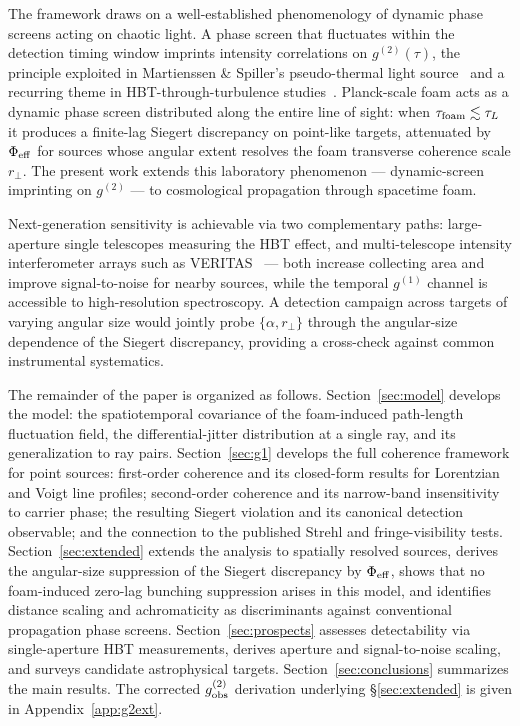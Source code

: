 \documentclass[aps,prd,onecolumn,amsmath,amssymb]{revtex4-2}
\begin{document}
The framework draws on a well-established phenomenology of dynamic phase
screens acting on chaotic light.
A phase screen that fluctuates within the detection timing window imprints
intensity correlations on $g^{(2)}(\tau)$, the principle exploited in
Martienssen \& Spiller's pseudo-thermal light source~\cite{MartienssenSpiller1964}
and a recurring theme in HBT-through-turbulence
studies~\cite{Goodman2007,MandelWolf1995}.
Planck-scale foam acts as a dynamic phase screen distributed along the
entire line of sight: when $\tau_{\rm foam}\lesssim\tau_L$ it produces a
finite-lag Siegert discrepancy on point-like targets, attenuated by
$\Phi_{\rm eff}$ for sources whose angular extent resolves the foam
transverse coherence scale $r_\perp$.
The present work extends this laboratory phenomenon --- dynamic-screen
imprinting on $g^{(2)}$ --- to cosmological propagation through spacetime foam.

Next-generation sensitivity is achievable via two complementary paths:
large-aperture single telescopes measuring the HBT effect, and multi-telescope
intensity interferometer arrays such as
VERITAS~\cite{Abeysekara2020,Acharyya2024} --- both increase collecting area
and improve signal-to-noise for nearby sources, while the temporal
$g^{(1)}$ channel is accessible to high-resolution spectroscopy.
A detection campaign across targets of varying angular size would
jointly probe $\{\alpha, r_\perp\}$ through the angular-size dependence
of the Siegert discrepancy, providing a cross-check against common
instrumental systematics.

The remainder of the paper is organized as follows.
Section~\ref{sec:model} develops the model: the spatiotemporal covariance of
the foam-induced path-length fluctuation field, the differential-jitter
distribution at a single ray, and its generalization to ray pairs.
Section~\ref{sec:g1} develops the full coherence framework for point sources:
first-order coherence and its closed-form results for Lorentzian and Voigt
line profiles; second-order coherence and its narrow-band insensitivity to
carrier phase; the resulting Siegert violation and its canonical detection
observable; and the connection to the published Strehl and fringe-visibility
tests.
Section~\ref{sec:extended} extends the analysis to spatially resolved
sources, derives the angular-size suppression of the Siegert discrepancy
by $\Phi_{\rm eff}$, shows that no foam-induced zero-lag bunching
suppression arises in this model, and identifies distance scaling and
achromaticity as discriminants against conventional propagation phase
screens.
Section~\ref{sec:prospects} assesses detectability via single-aperture HBT
measurements, derives aperture and signal-to-noise scaling, and surveys
candidate astrophysical targets.
Section~\ref{sec:conclusions} summarizes the main results.
The corrected $g^{(2)}_{\rm obs}$ derivation underlying §\ref{sec:extended}
is given in Appendix~\ref{app:g2ext}.
\end{document}
